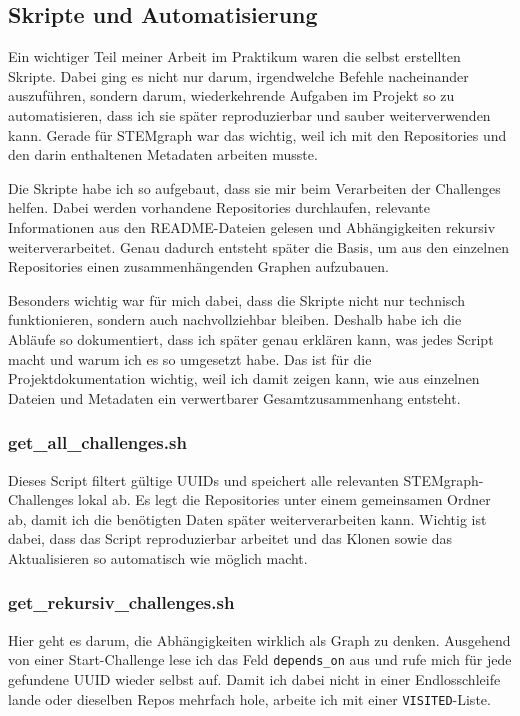 \subsection{Skripte und Automatisierung}

Ein wichtiger Teil meiner Arbeit im Praktikum waren die selbst erstellten Skripte. Dabei ging es nicht nur darum, irgendwelche Befehle nacheinander auszuführen, sondern darum, wiederkehrende Aufgaben im Projekt so zu automatisieren, dass ich sie später reproduzierbar und sauber weiterverwenden kann. Gerade für STEMgraph war das wichtig, weil ich mit den Repositories und den darin enthaltenen Metadaten arbeiten musste.

Die Skripte habe ich so aufgebaut, dass sie mir beim Verarbeiten der Challenges helfen. Dabei werden vorhandene Repositories durchlaufen, relevante Informationen aus den README-Dateien gelesen und Abhängigkeiten rekursiv weiterverarbeitet. Genau dadurch entsteht später die Basis, um aus den einzelnen Repositories einen zusammenhängenden Graphen aufzubauen.

Besonders wichtig war für mich dabei, dass die Skripte nicht nur technisch funktionieren, sondern auch nachvollziehbar bleiben. Deshalb habe ich die Abläufe so dokumentiert, dass ich später genau erklären kann, was jedes Script macht und warum ich es so umgesetzt habe. Das ist für die Projektdokumentation wichtig, weil ich damit zeigen kann, wie aus einzelnen Dateien und Metadaten ein verwertbarer Gesamtzusammenhang entsteht.

\subsubsection{get\_all\_challenges.sh}

Dieses Script filtert gültige UUIDs und speichert alle relevanten STEMgraph-Challenges lokal ab. Es legt die Repositories unter einem gemeinsamen Ordner ab, damit ich die benötigten Daten später weiterverarbeiten kann. Wichtig ist dabei, dass das Script reproduzierbar arbeitet und das Klonen sowie das Aktualisieren so automatisch wie möglich macht.

\subsubsection{get\_rekursiv\_challenges.sh}

Hier geht es darum, die Abhängigkeiten wirklich als Graph zu denken. Ausgehend von einer Start-Challenge lese ich das Feld \texttt{depends\_on} aus und rufe mich für jede gefundene UUID wieder selbst auf. Damit ich dabei nicht in einer Endlosschleife lande oder dieselben Repos mehrfach hole, arbeite ich mit einer \texttt{VISITED}-Liste.

